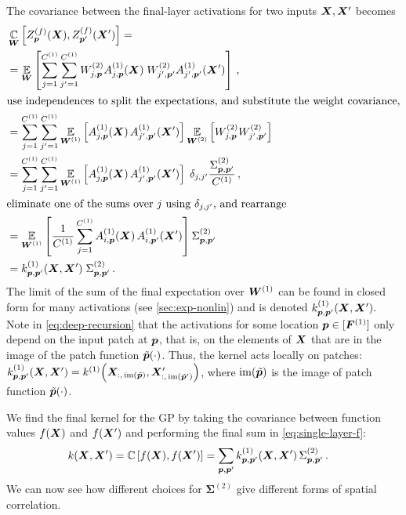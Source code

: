 \documentclass[accepted]{uai2021} %
\newcommand{\layerAsd}[2]{Z^{(#1)}_{#2}(\vX')}
\newcommand{\layerAs}[2]{Z^{(#1)}_{#2}(\vX)}
\newcommand{\layerC}[1]{C^{(#1)}}
\newcommand{\layerNLAsd}[2]{A^{(#1)}_{#2}(\vX')}
\newcommand{\layerNLAs}[2]{A^{(#1)}_{#2}(\vX)}
\newcommand{\layerWs}[1]{W^{(#1)}}
\newcommand{\layerW}[1]{\mW^{(#1)}}
\newcommand{\layersizebase}{\vF}
\newcommand{\layersize}[1]{{\layersizebase^{\bra{#1}}}}
\newcommand{\patchf}[2]{{\tilde#1\bra{#2}}}
\newcommand{\convpatch}[1]{{\text{im}\bra{\tilde#1}}}
\newcommand{\priorWcovs}[1]{\Sigma^{(#1)}}
\newcommand{\priorWcov}[1]{\boldsymbol{\Sigma}^{(#1)}}
\newcommand{\chan}{i}
\newcommand{\prevchan}{j}   %
\newcommand{\patch}{\vp}               %
\newcommand{\0}{\boldsymbol{0}}
\newcommand{\1}{\boldsymbol{1}}
\begin{document}
The covariance between the final-layer activations for two inputs ${\bm{X}},{\bm{X}}'$ becomes
\begin{align}
  &\Cov_{\vW}\left[\layerAs{f}{\patch},\layerAsd{f}{\patch'}\right] = \nonumber\\ &=\Expect{\vW}{\sum_{\prevchan=1}^{\layerC1}\sum_{\prevchan'=1}^{\layerC1} \layerWs{2}_{\prevchan,\patch}\layerNLAs{1}{\prevchan,\patch}\; \layerWs{2}_{\prevchan',\patch'}\layerNLAsd{1}{\prevchan',\patch'}}\,, \nonumber \\
  \intertext{use independences to split the expectations, and substitute the weight covariance,}
    &= \sum_{\prevchan=1}^{\layerC1}\sum_{\prevchan'=1}^{\layerC1} \Expect{\layerW1}{\layerNLAs{1}{\prevchan,\patch}\,\layerNLAsd{1}{\prevchan',\patch'}}\Expect{\layerW2}{\layerWs{2}_{\prevchan,\patch} \layerWs{2}_{\prevchan',\patch'}} \nonumber \\
  &= \sum_{\prevchan=1}^{\layerC1}\sum_{\prevchan'=1}^{\layerC1} \Expect{\layerW1}{\layerNLAs{1}{\prevchan,\patch}\,\layerNLAsd{1}{\prevchan',\patch'}}\;\delta_{\prevchan,\prevchan'}
    \frac{\priorWcovs{2}_{\patch,\patch'}}{\layerC{1}}\,,\nonumber \\
  \intertext{eliminate one of the sums over $\prevchan$ using $\delta_{\prevchan,\prevchan'}$, and rearrange}
  &= \Expect{\layerW1}{
\frac{1}{\layerC1}\sum_{\prevchan=1}^{\layerC1} \layerNLAs{1}{\chan,\patch}\,\layerNLAsd{1}{\chan,\patch'}}
    \priorWcovs{2}_{\patch,\patch'} \nonumber \\
  &=  k\ssup{1}_{\patch,\patch'}\bra{\mX,\mX'}  \;\priorWcovs{2}_{\patch,\patch'} \,.
\end{align}
The limit of the sum of the final expectation over $\layerW1$ can be found in closed form for many activations (see \cref{sec:exp-nonlin}) and is denoted $k\ssup{1}_{\patch,\patch'}\bra{\mX,\mX'}.$
Note in \cref{eq:deep-recursion} that the activations for some location $\patch\in\countto{\layersize{1}}$ only depend on the input patch at $\patch$, that is, on the elements of ${\bm{X}}$ that are in the image of the patch function $\patchf{\patch}{\cdot}$. Thus, the kernel acts locally on patches:
$k\ssup{1}_{\patch,\patch'}\bra{\mX,\mX'} = k\ssup{1}\bra{\mX_{:,\,\convpatch{\patch}},\mX'_{:,\,\convpatch{\patch'}}}$, where $\convpatch{\patch}$ is the image of patch function $\patchf{\patch}{\cdot}$.

We find the final kernel for the GP by taking the covariance between function values $f({\bm{X}})$ and $f({\bm{X}}')$ and performing the final sum in \cref{eq:single-layer-f}:
\begin{align}
    k(\vX, \vX') &= \Cov\left[f(\vX), f(\vX')\right]
    = \sum_{\patch,\patch'} k\ssup{1}_{\patch,\patch'}\bra{\mX,\mX'}\, \priorWcovs{2}_{\patch,\patch'} \label{eq:cov-kernel} \,.
\end{align}
We can now see how different choices for $\priorWcov2$ give different forms of spatial correlation.
\end{document}
